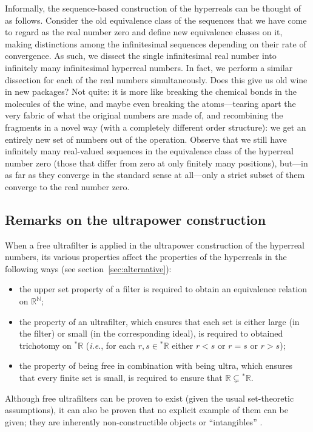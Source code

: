 Informally, the sequence-based construction of the hyperreals can be thought of as follows.
Consider the old equivalence class of the sequences that we have come to regard as the real number zero and define new equivalence classes on it, making distinctions among the infinitesimal sequences depending on their rate of convergence. As such, we dissect the single infinitesimal real number into infinitely many infinitesimal hyperreal numbers. In fact, we perform a similar dissection for each of the real numbers simultaneously.
Does this give us old wine in new packages? Not quite: it is more like breaking the chemical bonds in the molecules of the wine, and maybe even breaking the atoms---tearing apart the very fabric of what the original numbers are made of, and recombining the fragments in a novel way (with a completely different order structure): we get an entirely new set of numbers out of the operation.
Observe that we still have infinitely many real-valued sequences in the equivalence class of the hyperreal number zero (those that differ from zero at only finitely many positions), but---in as far as they converge in the standard sense at all---only a strict subset of them converge to the real number zero.

\subsection{Remarks on the ultrapower construction}
When a free ultrafilter is applied in the ultrapower construction of the hyperreal numbers, its various properties affect the properties of the hyperreals in the following ways (see section~\ref{sec:alternative}):
\begin{itemize}
  \item the upper set property of a filter is required to obtain an equivalence relation on $\mathbb{R}^\mathbb{N}$;
  \item the property of an ultrafilter, which ensures that each set is either large (in the filter) or small (in the corresponding ideal), is required to obtained trichotomy on ${^\ast\mathbb{R}}$ (\textit{i.e}., for each $r,s \in {^\ast\mathbb{R}}$ either $r<s$ or $r=s$ or $r>s$);
  \item the property of being free in combination with being ultra, which ensures that every finite set is small, is required to ensure that $\mathbb{R} \varsubsetneq {^\ast\mathbb{R}}$.
\end{itemize}

Although free ultrafilters can be proven to exist (given the usual set-theoretic assumptions), it can also be proven that no explicit example of them can be given; they are inherently non-constructible objects or ``intangibles'' \citep{Schechter:1997}.

